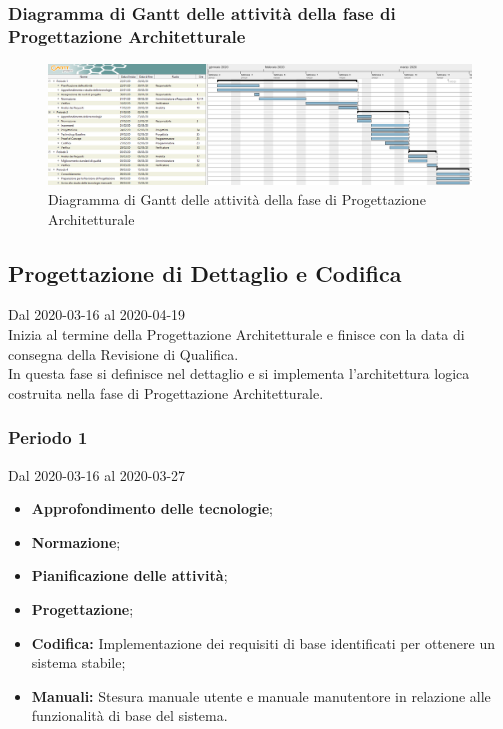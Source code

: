 \newpage
\begin{landscape}
\subsubsection{Diagramma di Gantt delle attività della fase di Progettazione Architetturale}
\pagestyle{empty}
\begin{figure}[h]
	\centering
	\includegraphics[scale=1.48]{Sezioni/DiagrammiGantt/ProgettazioneArchitetturale.png}
	\caption{Diagramma di Gantt delle attività della fase di Progettazione Architetturale}	
\end{figure}
\end{landscape}

\subsection{Progettazione di Dettaglio e Codifica}
Dal 2020-03-16 al 2020-04-19\\
Inizia al termine della Progettazione Architetturale e finisce con la data di consegna della Revisione di Qualifica.\\
In questa fase si definisce nel dettaglio e si implementa l'architettura logica costruita nella fase di Progettazione Architetturale.\\


\subsubsection{Periodo 1} 
Dal 2020-03-16 al 2020-03-27\\
\begin{itemize}
	\item \textbf{Approfondimento delle tecnologie};
	\item \textbf{Normazione};
	\item \textbf{Pianificazione delle attività};
	\item \textbf{Progettazione};
	\item \textbf{Codifica:} Implementazione dei requisiti di base identificati per ottenere un sistema stabile;
	\item \textbf{Manuali:} Stesura manuale utente e manuale manutentore in relazione alle funzionalità di base del sistema.
\end{itemize}
